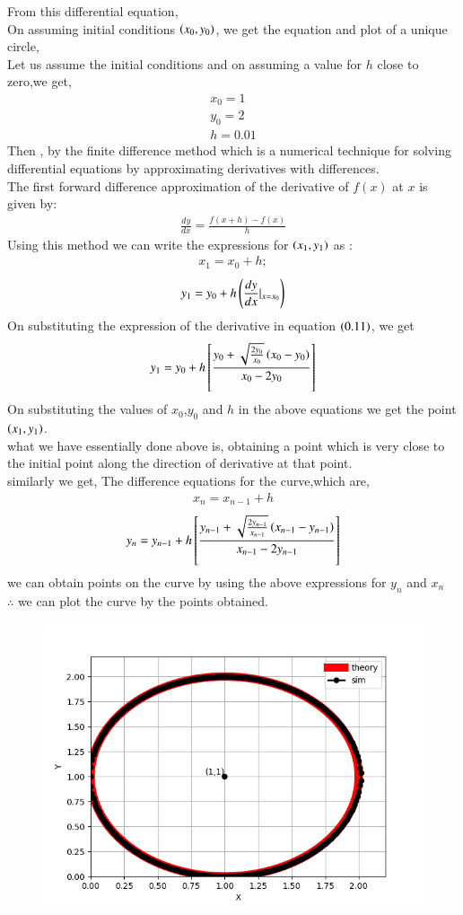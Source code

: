 \documentclass[journal]{IEEEtran}
\begin{document}
 From this differential equation,\\
 On assuming initial conditions $\left(x_0,y_0\right)$, we get the equation and plot of a unique circle,\\
 Let us assume the initial conditions and on assuming a value for $h$ close to zero,we get,
 \begin{align}
     x_0 = 1\\
     y_0 = 2\\
     h = 0.01
 \end{align}
 Then , by the finite difference method which is a numerical technique for solving differential equations by approximating derivatives with differences.\\
The first forward difference approximation of the derivative of $f(x)$ at $x$ is given by: 
\begin{align}
    \frac{dy}{dx}=\frac{f(x+h)-f(x)}{h}      
\end{align}
Using this method we can write the expressions for $\left(x_1,y_1\right)$ as :
\begin{align}
    x_1 = x_0 + h;
\end{align}
\begin{align}
  y_1 = y_0 + h\left(\frac{dy}{dx}|_{x=x_0}\right)   
\end{align}
On substituting the expression of the derivative in equation $\left(0.11\right)$, we get
\begin{align}
    y_1 = y_0 + h\left[\frac{y_0  + \sqrt{\frac{2y_0}{x_0}}\left(x_0 - y_0\right)}{x_0 - 2y_0}\right]
\end{align}
On substituting the values of $x_0$,$y_0$ and $h$ in the above equations we get the point $\left(x_1,y_1\right)$. \\
what we have essentially done above is, obtaining a point which is very close to the initial point along the direction of derivative at that point.\\
similarly we get, The difference equations for the curve,which are,
\begin{align}
     x_n = x_{n-1} + h 
\end{align}
\begin{align}
y_n = y_{n-1} + h\left[\frac{y_{n-1}  + \sqrt{\frac{2y_{n-1}}{x_{n-1}}}\left(x_{n-1} - y_{n-1}\right)}{x_{n-1} - 2y_{n-1}}\right]
\end{align}
we can obtain points on the curve by using the above expressions for $y_n$ and $x_n$\\
 $\therefore$ we can plot the curve by the points obtained.
 \begin{figure}[h!]
   \centering
   \includegraphics[width=0.75\columnwidth]{figures/Figure_1.png}
   \label{graph of the function}
\end{figure}
\end{document}
